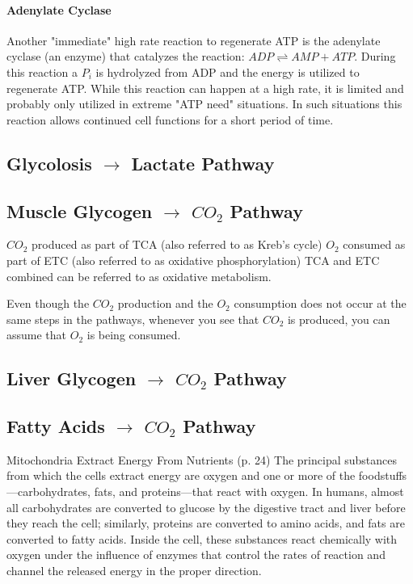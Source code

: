 \paragraph{Adenylate Cyclase}

Another "immediate" high rate reaction to regenerate ATP is the adenylate cyclase (an enzyme) that catalyzes the reaction: $ADP \rightleftharpoons AMP + ATP$. During this reaction a $P_i$ is hydrolyzed from ADP and the energy is utilized to regenerate ATP. While this reaction can happen at a high rate, it is limited and probably only utilized in extreme "ATP need" situations. In such situations this reaction allows continued cell functions for a short period of time. 

\subsection{Glycolosis $\rightarrow$ Lactate Pathway}

\subsection{Muscle Glycogen $\rightarrow$ $CO_2$ Pathway}

$CO_2$ produced as part of TCA (also referred to as Kreb's cycle)
$O_2$ consumed as part of ETC (also referred to as oxidative phosphorylation)
TCA and ETC combined can be referred to as oxidative metabolism. 

Even though the $CO_2$ production and the $O_2$ consumption does not occur at the same steps in the pathways, whenever you see that $CO_2$ is produced, you can assume that $O_2$ is being consumed. 

\subsection{Liver Glycogen $\rightarrow$ $CO_2$ Pathway}

\subsection{Fatty Acids $\rightarrow$ $CO_2$ Pathway}



Mitochondria Extract Energy From Nutrients (p. 24) The principal substances from which the cells extract energy are oxygen and one or more of the foodstuffs—carbohydrates, fats, and proteins—that react with oxygen. In humans, almost all carbohydrates are converted to glucose by the digestive tract and liver before they reach the cell; similarly, proteins are converted to amino acids, and fats are converted to fatty acids. Inside the cell, these substances react chemically with oxygen under the influence of enzymes that control the rates of reaction and channel the released energy in the proper direction.

